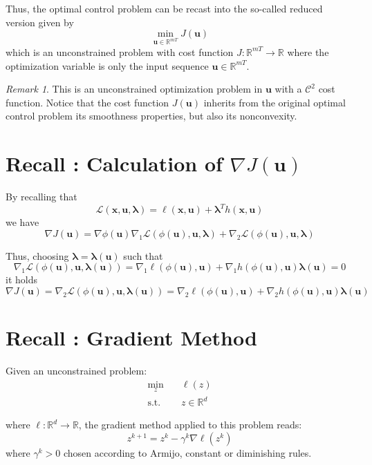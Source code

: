 \documentclass[openany]{book}
\newcommand{\R}{\mathbb{R}}               %
\theoremstyle{definition}
\theoremstyle{remark}
\newtheorem*{remark}{Remark}
\begin{document}
Thus, the optimal control problem can be recast into the so-called reduced version given by
\[
    \min_{\mathbf{u}\in\R^{mT}} J(\mathbf{u})
\]
which is an unconstrained problem with cost function $J:\R^{mT}\to\R$ where the optimization variable is only the input sequence $\mathbf{u}\in\R^{mT}$.

\begin{remark}
This is an unconstrained optimization problem in $\mathbf{u}$ with a $\mathcal{C}^2$ cost function. Notice that the cost function $J(\mathbf{u})$ inherits from the original optimal control problem its smoothness properties, but also its nonconvexity.
\end{remark}

\section{Recall : Calculation of \texorpdfstring{$\nabla J(\mathbf{u})$}{Gradient of J(u)}}
By recalling that
\[
    \mathcal{L}(\mathbf{x}, \mathbf{u}, \boldsymbol{\lambda}) = \ell(\mathbf{x}, \mathbf{u}) + \boldsymbol{\lambda}^T h(\mathbf{x}, \mathbf{u})
\]
we have
\[
    \nabla J(\mathbf{u}) = \nabla\phi(\mathbf{u})\nabla_1\mathcal{L}(\phi(\mathbf{u}), \mathbf{u}, \boldsymbol{\lambda}) + \nabla_2\mathcal{L}(\phi(\mathbf{u}), \mathbf{u}, \boldsymbol{\lambda})
\]

Thus, choosing $\boldsymbol{\lambda} = \boldsymbol{\lambda}(\mathbf{u})$ such that
\[
    \nabla_1\mathcal{L}(\phi(\mathbf{u}), \mathbf{u}, \boldsymbol{\lambda}(\mathbf{u})) = \nabla_1\ell(\phi(\mathbf{u}), \mathbf{u}) + \nabla_1h(\phi(\mathbf{u}), \mathbf{u})\boldsymbol{\lambda}(\mathbf{u}) = 0
\]
it holds
\[
    \nabla J(\mathbf{u}) = \nabla_2\mathcal{L}(\phi(\mathbf{u}), \mathbf{u}, \boldsymbol{\lambda}(\mathbf{u})) = \nabla_2\ell(\phi(\mathbf{u}), \mathbf{u}) + \nabla_2h(\phi(\mathbf{u}), \mathbf{u})\boldsymbol{\lambda}(\mathbf{u})
\]

\section{Recall : Gradient Method}
Given an unconstrained problem:
\begin{align*}
    \min_z & \quad \ell(z)\\
    \text{s.t.} & \quad z\in\R^d
\end{align*}

where $\ell:\R^d\to\R$, the gradient method applied to this problem reads:
\[
    z^{k+1} = z^k - \gamma^k\nabla\ell(z^k)
\]
where $\gamma^k > 0$ chosen according to Armijo, constant or diminishing rules.
\end{document}
